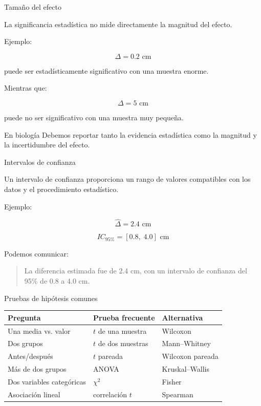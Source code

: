 \documentclass[aspectratio=169,11pt]{beamer}
\begin{document}
\begin{frame}{Tamaño del efecto}

La significancia estadística no mide directamente la magnitud del efecto.

Ejemplo:

\[
\Delta = 0.2\text{ cm}
\]

puede ser estadísticamente significativo con una muestra enorme.

Mientras que:

\[
\Delta = 5\text{ cm}
\]

puede no ser significativo con una muestra muy pequeña.

\begin{block}{En biología}
Debemos reportar tanto la evidencia estadística como la magnitud
y la incertidumbre del efecto.
\end{block}

\end{frame}

\begin{frame}{Intervalos de confianza}

Un intervalo de confianza proporciona un rango de valores
compatibles con los datos y el procedimiento estadístico.

Ejemplo:

\[
\widehat{\Delta}=2.4\text{ cm}
\]

\[
IC_{95\%}=[0.8,\;4.0]\text{ cm}
\]

Podemos comunicar:

\begin{quote}
La diferencia estimada fue de 2.4 cm, con un intervalo de confianza
del 95\% de 0.8 a 4.0 cm.
\end{quote}

\end{frame}

\begin{frame}{Pruebas de hipótesis comunes}

\begin{center}
\begin{tabular}{lll}
\toprule
\textbf{Pregunta} & \textbf{Prueba frecuente} & \textbf{Alternativa}\\
\midrule
Una media vs. valor & $t$ de una muestra & Wilcoxon\\
Dos grupos & $t$ de dos muestras & Mann--Whitney\\
Antes/después & $t$ pareada & Wilcoxon pareada\\
Más de dos grupos & ANOVA & Kruskal--Wallis\\
Dos variables categóricas & $\chi^2$ & Fisher\\
Asociación lineal & correlación $t$ & Spearman\\
\bottomrule
\end{tabular}
\end{center}

\end{frame}
\end{document}
